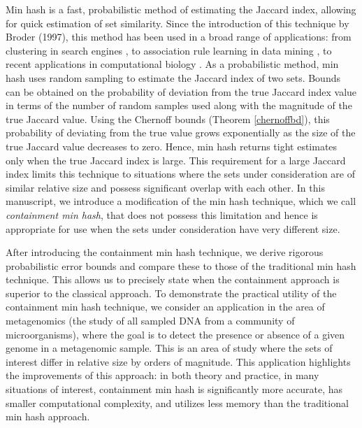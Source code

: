 \documentclass[11pt,reqno]{amsart}
\theoremstyle{remark}
\numberwithin{equation}{section}
\begin{document}
Min hash\cite{broder1997resemblance} is a fast, probabilistic method of estimating the Jaccard index, allowing for quick estimation of set similarity. Since the introduction of this technique by Broder (1997), this method has been used in a broad range of applications: from clustering in search engines \cite{das2007google}, to association rule learning in data mining \cite{cohen2001finding}, to recent applications in computational biology \cite{ondov2016mash, sourmash}. As a probabilistic method, min hash uses random sampling to estimate the Jaccard index of two sets. Bounds can be obtained on the probability of deviation from the true Jaccard index value in terms of the number of random samples used along with the magnitude of the true Jaccard value. Using the Chernoff bounds (Theorem \ref{chernoffbd}), this probability of deviating from the true value grows exponentially as the size of the true Jaccard value decreases to zero. Hence, min hash returns tight estimates only when the true Jaccard index is large. This requirement for a large Jaccard index limits this technique to situations where the sets under consideration are of similar relative size and possess significant overlap with each other. In this manuscript, we introduce a modification of the min hash technique, which we call \textit{containment min hash}, that does not possess this limitation and hence is appropriate for use when the sets under consideration have very different size.

After introducing the containment min hash technique, we derive rigorous probabilistic error bounds and compare these to those of the traditional min hash technique. This allows us to precisely state when the containment approach is superior to the classical approach. To demonstrate the practical utility of the containment min hash technique, we consider an application in the area of metagenomics (the study of all sampled DNA from a community of microorganisms), where the goal is to detect the presence or absence of a given genome in a metagenomic sample. This is an area of study where the sets of interest differ in relative size by orders of magnitude. This application highlights the improvements of this approach: in both theory and practice, in many situations of interest, containment min hash is significantly more accurate, has smaller computational complexity, and utilizes less memory than the traditional min hash approach.
\end{document}
